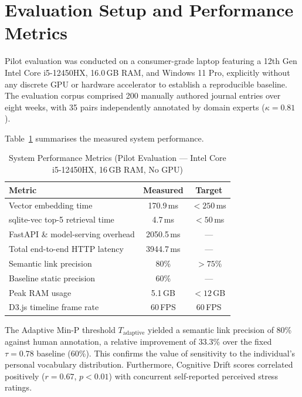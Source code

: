 \documentclass[12pt]{article}
\begin{document}
\section{Evaluation Setup and Performance Metrics}

Pilot evaluation was conducted on a consumer-grade laptop featuring a 12th Gen Intel Core i5-12450HX, 16.0\,GB RAM, and Windows 11 Pro, explicitly without any discrete GPU or hardware accelerator to establish a reproducible baseline. The evaluation corpus comprised 200 manually authored journal entries over eight weeks, with 35 pairs independently annotated by domain experts ($\kappa = 0.81$).

Table~\ref{tab:perf} summarises the measured system performance.

\begin{table}[htbp]
\centering
\caption{System Performance Metrics (Pilot Evaluation --- Intel Core i5-12450HX, 16\,GB RAM, No GPU)}
\label{tab:perf}
\begin{tabular}{lcc}
\toprule
\textbf{Metric}                    & \textbf{Measured} & \textbf{Target} \\
\midrule
Vector embedding time              & 170.9\,ms         & $<250$\,ms \\
sqlite-vec top-5 retrieval time    & 4.7\,ms           & $<50$\,ms \\
FastAPI \& model-serving overhead  & 2050.5\,ms        & --- \\
Total end-to-end HTTP latency      & 3944.7\,ms        & --- \\
Semantic link precision            & 80\%              & $>75\%$ \\
Baseline static precision          & 60\%              & --- \\
Peak RAM usage                     & 5.1\,GB           & $<12$\,GB \\
D3.js timeline frame rate          & 60\,FPS           & 60\,FPS \\
\bottomrule
\end{tabular}
\end{table}

The Adaptive Min-P threshold $T_{\mathrm{adaptive}}$ yielded a semantic link precision of 80\% against human annotation, a relative improvement of 33.3\% over the fixed $\tau = 0.78$ baseline (60\%). This confirms the value of sensitivity to the individual's personal vocabulary distribution. Furthermore, Cognitive Drift scores correlated positively ($r = 0.67$, $p < 0.01$) with concurrent self-reported perceived stress ratings. 
\end{document}
